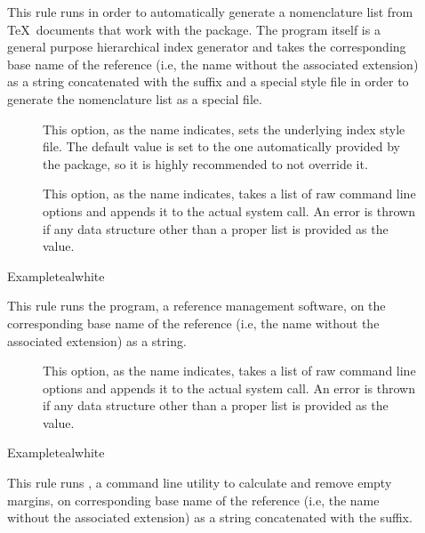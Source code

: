 \begin{description}
\item[]
This rule runs  in order to automatically generate a nomenclature list from \TeX\ documents that work with the  package. The program itself is a general purpose hierarchical index generator and takes the corresponding base name of the  reference (i.e, the name without the associated extension) as a string concatenated with the  suffix and a special style file in order to generate the nomenclature list as a special  file.

\begin{description}
\item[] This option, as the name indicates, sets the underlying index style file. The default value is set to the one automatically provided by the  package, so it is highly recommended to not override it.

\item[] This option, as the name indicates, takes a list of raw command line options and appends it to the actual system call. An error is thrown if any data structure other than a proper list is provided as the value.
\end{description}

\begin{codebox}{Example}{teal}{\icnote}{white}
\end{codebox}

\item[]
This rule runs the  program, a reference management software, on the corresponding base name of the  reference (i.e, the name without the associated extension) as a string.

\begin{description}
\item[] This option, as the name indicates, takes a list of raw command line options and appends it to the actual system call. An error is thrown if any data structure other than a proper list is provided as the value.
\end{description}

\begin{codebox}{Example}{teal}{\icnote}{white}
\end{codebox}

\item[]
This rule runs , a command line utility to calculate and remove empty margins, on corresponding base name of the  reference (i.e, the name without the associated extension) as a string concatenated with the  suffix.


\end{description}
